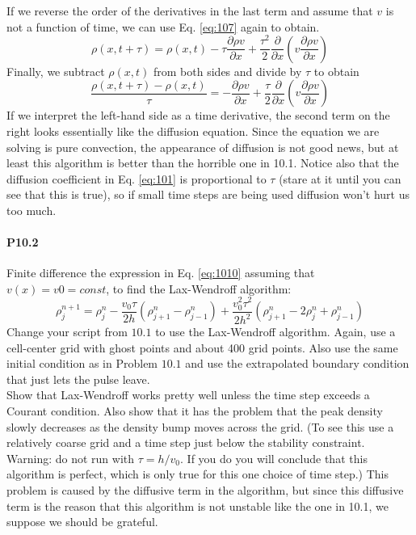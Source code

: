 If we reverse the order of the derivatives in the last term and assume that $v$ is not
a function of time, we can use Eq. \eqref{eq:107} again to obtain.
\begin{equation}\label{eq:109}
\rho(x, t+\tau)=\rho(x, t)-\tau \frac{\partial \rho v}{\partial x}+\frac{\tau^{2}}{2} \frac{\partial}{\partial x}\left(v \frac{\partial \rho v}{\partial x}\right)
\end{equation}
Finally, we subtract $ρ(x,t)$ from both sides and divide by $\tau$ to obtain
\begin{equation}\label{eq:1010}
\frac{\rho(x, t+\tau)-\rho(x, t)}{\tau}=-\frac{\partial \rho v}{\partial x}+\frac{\tau}{2} \frac{\partial}{\partial x}\left(v \frac{\partial \rho v}{\partial x}\right)
\end{equation}
If we interpret the left-hand side as a time derivative, the second term on the right looks essentially like the diffusion equation. Since the equation we are solving is pure convection, the appearance of diffusion is not good news, but at least this algorithm is better than the horrible one in 10.1. Notice also that the diffusion coefficient in Eq. \eqref{eq:101} is proportional to $\tau$ (stare at it until you can see that this is true), so if small time steps are being used diffusion won't hurt us too much.

\paragraph*{P10.2}
 Finite difference the expression in Eq. \eqref{eq:1010} assuming that $v(x) = v0 =
const$, to find the Lax-Wendroff algorithm:
\begin{equation}\label{eq:1011}
\rho_{j}^{n+1}=\rho_{j}^{n}-\frac{v_{0} \tau}{2 h}\left(\rho_{j+1}^{n}-\rho_{j-1}^{n}\right)+\frac{v_{0}^{2} \tau^{2}}{2 h^{2}}\left(\rho_{j+1}^{n}-2 \rho_{j}^{n}+\rho_{j-1}^{n}\right)
\end{equation}
Change your script from $10.1$ to use the Lax-Wendroff algorithm. Again, use a cell-center grid with ghost points and about 400 grid points. Also use the same initial condition as in Problem $10.1$ and use the extrapolated boundary condition that just lets the pulse leave.\\
Show that Lax-Wendroff works pretty well unless the time step exceeds a Courant condition. Also show that it has the problem that the peak density slowly decreases as the density bump moves across the grid. (To see this use a relatively coarse grid and a time step just below the stability constraint.\\
Warning: do not run with $\tau=h / v_{0}$. If you do you will conclude that this algorithm is perfect, which is only true for this one choice of time step.) This problem is caused by the diffusive term in the algorithm, but since this diffusive term is the reason that this algorithm is not unstable like the one in 10.1, we suppose we should be grateful.

